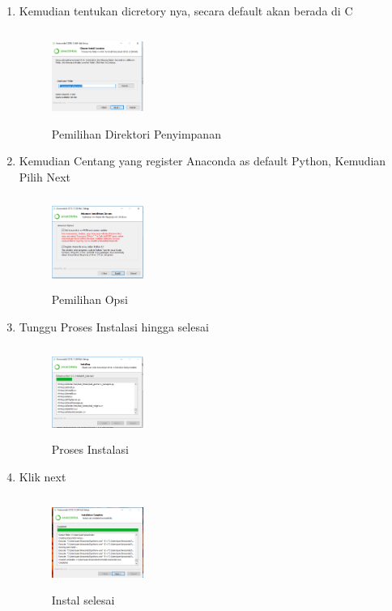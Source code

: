 \begin{enumerate}
    \item Kemudian tentukan dicretory nya, secara default akan berada di C
    \begin{figure}[!htbp]
        \centering
        \includegraphics[width=3cm,height=3cm]{figures/lima.png}
        \caption{Pemilihan Direktori Penyimpanan}
        \label{Directory}
        \end{figure}

    \item Kemudian Centang yang register Anaconda as default Python, Kemudian Pilih Next
    \begin{figure}[!htbp]
        \centering
        \includegraphics[width=3cm,height=3cm]{figures/enam.png}
        \caption{Pemilihan Opsi}
        \label{opsi}
        \end{figure}

    \item Tunggu Proses Instalasi hingga selesai
    \begin{figure}[!htbp]
        \centering
        \includegraphics[width=3cm,height=3cm]{figures/tujuh.png}
        \caption{Proses Instalasi}
        \label{Proses}
        \end{figure}

    \item Klik next
    \begin{figure}[!htbp]
        \centering
        \includegraphics[width=3cm,height=3cm]{figures/delapan.png}
        \caption{Instal selesai}
        \label{Proses}
        \end{figure}


\end{enumerate}
